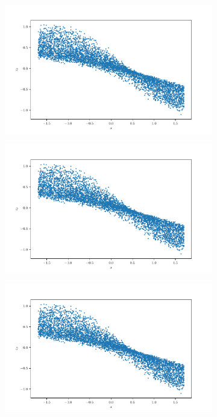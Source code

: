\documentclass[10pt,a4paper]{article}
\begin{document}
\begin{figure}[!ht]
\centering
\begin{subfigure}{0.3\textwidth}
	\centering
	\includegraphics[width=\textwidth] {cube_trans_x_z0.pdf}
	\caption{}
	\label{cfig_xzo}
\end{subfigure}
\begin{subfigure}{0.3\textwidth}
	\centering	
	\includegraphics[width=\textwidth]{cube_trans_x_z0.pdf}
	\caption{}
	\label{cfig_xz1}
\end{subfigure}
\begin{subfigure}{0.3\textwidth}
	\centering
	\includegraphics[width=\textwidth] {cube_trans_x_z0.pdf}

\end{subfigure}
\end{figure}
\end{document}
